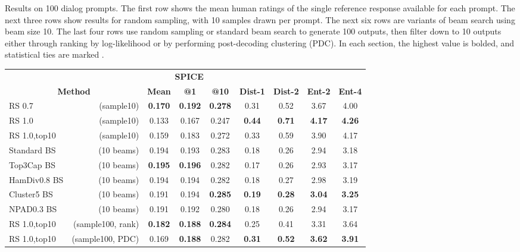 \begin{table}[t]
    \caption{
    Results on 100 dialog prompts.
    The first row shows the mean human ratings of the single reference response available for each prompt.
    The next three rows show results for random sampling, with 10 samples drawn per prompt. The next six rows are variants of beam search using beam size 10.
    The last four rows use random sampling or standard beam search to generate 100 outputs, then filter down to 10 outputs either through ranking by log-likelihood or by performing post-decoding clustering (PDC).
    In each section, the highest value is bolded, and statistical ties are marked \textdagger.}
    \label{tab:results_no_cluster}
\end{table}

\begin{table}
    \small
    \centering
\begin{tabular}{|lr||ccc||cccc|}
\hline
 & & \multicolumn{3}{c||}{\textbf{SPICE}} & & & & \\
\multicolumn{2}{|c||}{\textbf{Method}} & \textbf{Mean} & \textbf{@1} & \textbf{@10} & \textbf{Dist-1} & \textbf{Dist-2} & \textbf{Ent-2} & \textbf{Ent-4}  \\
\hline\hline
RS 0.7 &(sample10)               & \textbf{0.170} & \textbf{0.192} & \textbf{0.278} & 0.31 & 0.52 & 3.67 & 4.00 \\
RS 1.0 &(sample10)               & 0.133 & 0.167 & 0.247 & \textbf{0.44} & \textbf{0.71} & \textbf{4.17} & \textbf{4.26} \\
RS 1.0,top10 &(sample10)         & 0.159 & 0.183 & 0.272 & 0.33 & 0.59 & 3.90 & 4.17 \\
\hline \hline
Standard BS &(10 beams)               & 0.194 & 0.193 & 0.283 & 0.18 & 0.26 & 2.94 & 3.18 \\
Top3Cap BS &(10 beams)                & \textbf{0.195} & \textbf{0.196} & 0.282 & 0.17 & 0.26 & 2.93 & 3.17 \\
HamDiv0.8 BS &(10 beams)              & 0.194 & 0.194 & 0.282 & 0.18 & 0.27 & 2.98 & 3.19 \\
Cluster5 BS &(10 beams)               & 0.191 & 0.194 & \textbf{0.285} & \textbf{0.19} & \textbf{0.28} & \textbf{3.04} & \textbf{3.25} \\
NPAD0.3 BS &(10 beams)                & 0.191 & 0.192 & 0.280 & 0.18 & 0.26 & 2.94 & 3.17 \\
\hline \hline
RS 1.0,top10 &(sample100, rank)  & \textbf{0.182} & \textbf{0.188} & \textbf{0.284} & 0.25 & 0.41 & 3.31 & 3.64 \\
RS 1.0,top10 &(sample100, PDC)   & 0.169 & \textbf{0.188} & 0.282 & \textbf{0.31} & \textbf{0.52} & \textbf{3.62} & \textbf{3.91} \\

\end{tabular}
\end{table}
